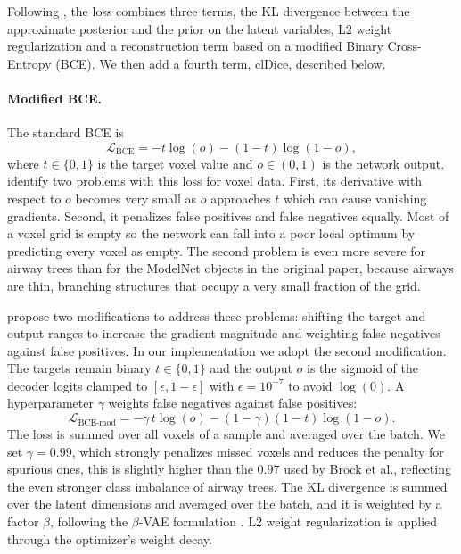 Following \citet{brock2016}, the loss combines three terms, the KL divergence
between the approximate posterior and the prior on the latent variables, L2 weight
regularization and a reconstruction term based on a modified Binary Cross-Entropy (BCE).
We then add a fourth term, clDice, described below.

\paragraph{Modified BCE.}                %
The standard BCE is
\begin{equation}
  \mathcal{L}_{\mathrm{BCE}} = -t\log(o) - (1-t)\log(1-o),
  \label{eq:bce}                         %
\end{equation}
where $t \in \{0,1\}$ is the target voxel value and $o \in (0,1)$ is the network output.
\citet{brock2016} identify two problems with this loss for voxel data. First, its
derivative with respect to $o$ becomes very small as $o$ approaches $t$ which can cause
vanishing gradients. Second, it penalizes false positives and false negatives equally. Most
of a voxel grid is empty so the network can fall into a poor local optimum by predicting
every voxel as empty. The second problem is even more severe for airway trees than for the
ModelNet objects in the original paper, because airways are thin, branching structures that occupy a
very small fraction of the grid.

\citet{brock2016} propose two modifications to address these problems: shifting
the target and output ranges to increase the gradient magnitude and weighting false negatives
against false positives. In our implementation we adopt the second modification. The targets
remain binary $t \in \{0,1\}$ and the output $o$ is the sigmoid of the decoder logits
clamped to $[\epsilon, 1-\epsilon]$ with $\epsilon = 10^{-7}$ to avoid $\log(0)$. A
hyperparameter $\gamma$ weights false negatives against false positives:
\begin{equation}
  \mathcal{L}_{\mathrm{BCE\text{-}mod}} = -\gamma\, t\log(o) - (1-\gamma)(1-t)\log(1-o).
  \label{eq:bce_mod}                     %
\end{equation}
The loss is summed over all voxels of a sample and averaged over the batch. We set
$\gamma = 0.99$, which strongly penalizes missed voxels and reduces the penalty for
spurious ones, this is slightly higher than the $0.97$ used by Brock et al., reflecting the
even stronger class imbalance of airway trees. The KL divergence is summed over the latent dimensions and averaged over the batch, and it is
weighted by a factor $\beta$, following the $\beta$-VAE formulation \cite{higgins2017}.
L2 weight regularization is applied through the optimizer's weight decay.

